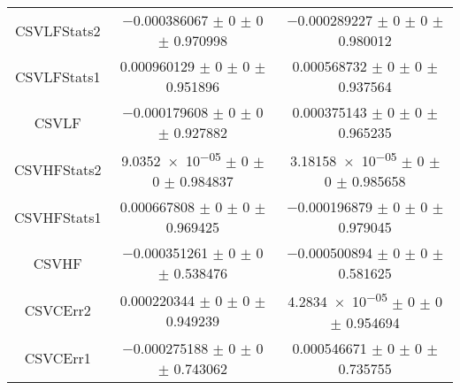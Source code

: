 \begin{table}
\begin{tabular}{ccc}
CSVLFStats2 	& \num{-0.000386067} $\pm$ \num{0} $\pm$ \num{0} $\pm$ \num{0.970998} 	& \num{-0.000289227} $\pm$ \num{0} $\pm$ \num{0} $\pm$ \num{0.980012}\\
CSVLFStats1 	& \num{0.000960129} $\pm$ \num{0} $\pm$ \num{0} $\pm$ \num{0.951896} 	& \num{0.000568732} $\pm$ \num{0} $\pm$ \num{0} $\pm$ \num{0.937564}\\
CSVLF 	& \num{-0.000179608} $\pm$ \num{0} $\pm$ \num{0} $\pm$ \num{0.927882} 	& \num{0.000375143} $\pm$ \num{0} $\pm$ \num{0} $\pm$ \num{0.965235}\\
CSVHFStats2 	& \num{9.0352e-05} $\pm$ \num{0} $\pm$ \num{0} $\pm$ \num{0.984837} 	& \num{3.18158e-05} $\pm$ \num{0} $\pm$ \num{0} $\pm$ \num{0.985658}\\
CSVHFStats1 	& \num{0.000667808} $\pm$ \num{0} $\pm$ \num{0} $\pm$ \num{0.969425} 	& \num{-0.000196879} $\pm$ \num{0} $\pm$ \num{0} $\pm$ \num{0.979045}\\
CSVHF 	& \num{-0.000351261} $\pm$ \num{0} $\pm$ \num{0} $\pm$ \num{0.538476} 	& \num{-0.000500894} $\pm$ \num{0} $\pm$ \num{0} $\pm$ \num{0.581625}\\
CSVCErr2 	& \num{0.000220344} $\pm$ \num{0} $\pm$ \num{0} $\pm$ \num{0.949239} 	& \num{4.2834e-05} $\pm$ \num{0} $\pm$ \num{0} $\pm$ \num{0.954694}\\
CSVCErr1 	& \num{-0.000275188} $\pm$ \num{0} $\pm$ \num{0} $\pm$ \num{0.743062} 	& \num{0.000546671} $\pm$ \num{0} $\pm$ \num{0} $\pm$ \num{0.735755}\\
\bottomrule
\end{tabular}
\end{table}
